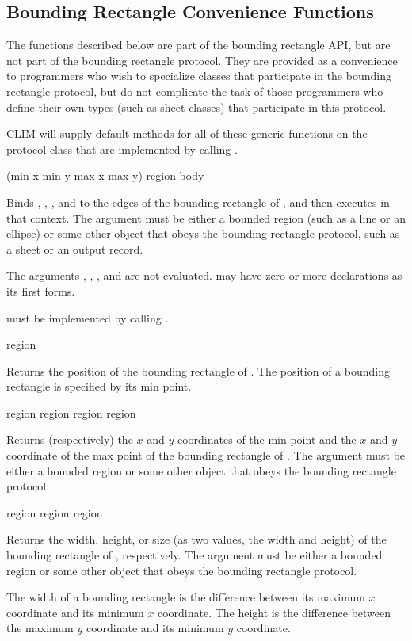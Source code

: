 \subsection {Bounding Rectangle Convenience Functions}

The functions described below are part of the bounding rectangle API, but are
not part of the bounding rectangle protocol.  They are provided as a convenience
to programmers who wish to specialize classes that participate in the bounding
rectangle protocol, but do not complicate the task of those programmers who
define their own types (such as sheet classes) that participate in this
protocol.

CLIM will supply default methods for all of these generic functions on the
protocol class  that are implemented by calling
.


 {(min-x min-y max-x max-y) region \body body}  

Binds , , , and  to the edges of the
bounding rectangle of , and then executes  in that
context.  The argument  must be either a bounded region (such as a
line or an ellipse) or some other object that obeys the bounding rectangle
protocol, such as a sheet or an output record.

The arguments , , , and  are not
evaluated.   may have zero or more declarations as its first forms.

 must be implemented by calling .


 {region}

Returns the position of the bounding rectangle of .  The position of
a bounding rectangle is specified by its min point.


 {region}
 {region}
 {region}
 {region}

Returns (respectively) the $x$ and $y$ coordinates of the min point and the $x$
and $y$ coordinate of the max point of the bounding rectangle of .
The argument  must be either a bounded region or some other object
that obeys the bounding rectangle protocol.


  {region}
 {region}
   {region}

Returns the width, height, or size (as two values, the width and height) of the
bounding rectangle of , respectively.  The argument 
must be either a bounded region or some other object that obeys the bounding
rectangle protocol.

The width of a bounding rectangle is the difference between its maximum $x$
coordinate and its minimum $x$ coordinate.  The height is the difference between
the maximum $y$ coordinate and its minimum $y$ coordinate.

